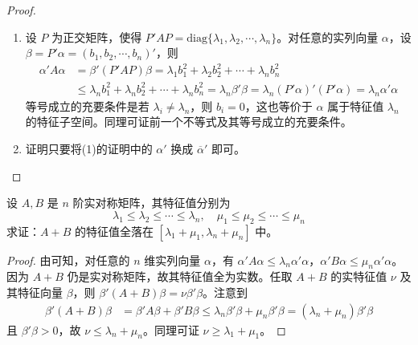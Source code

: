 \documentclass[../../main.tex]{subfiles}
\begin{document}
\begin{proof}
\begin{enumerate}[(1)]
\item 设 \(P\) 为正交矩阵，使得 \(P'AP = \mathrm{diag}\{\lambda_1,\lambda_2,\cdots,\lambda_n\}\)。对任意的实列向量 \(\alpha\)，设 \(\beta = P'\alpha = (b_1,b_2,\cdots,b_n)'\)，则
\begin{align*}
\alpha'A\alpha &= \beta'(P'AP)\beta = \lambda_1b_1^2 + \lambda_2b_2^2 + \cdots + \lambda_nb_n^2\\
&\leq \lambda_nb_1^2 + \lambda_nb_2^2 + \cdots + \lambda_nb_n^2 = \lambda_n\beta'\beta = \lambda_n(P'\alpha)'(P'\alpha) = \lambda_n\alpha'\alpha
\end{align*}
等号成立的充要条件是若 \(\lambda_i \neq \lambda_n\)，则 \(b_i = 0\)，这也等价于 \(\alpha\) 属于特征值 \(\lambda_n\) 的特征子空间。同理可证前一个不等式及其等号成立的充要条件。

\item 证明只要将(1)的证明中的 \(\alpha'\) 换成 \(\overline{\alpha}'\) 即可。
\end{enumerate}
\end{proof}

\begin{example}\label{example:例9.53}
设 \(A,B\) 是 \(n\) 阶实对称矩阵，其特征值分别为
\[
\lambda_1 \leq \lambda_2 \leq \cdots \leq \lambda_n,\quad \mu_1 \leq \mu_2 \leq \cdots \leq \mu_n
\]
求证：\(A + B\) 的特征值全落在 \([\lambda_1 + \mu_1,\lambda_n + \mu_n]\) 中。
\end{example}
\begin{proof}
由可知，对任意的 \(n\) 维实列向量 \(\alpha\)，有 \(\alpha'A\alpha \leq \lambda_n\alpha'\alpha\)，\(\alpha'B\alpha \leq \mu_n\alpha'\alpha\)。因为 \(A + B\) 仍是实对称矩阵，故其特征值全为实数。任取 \(A + B\) 的实特征值 \(\nu\) 及其特征向量 \(\beta\)，则 \(\beta'(A + B)\beta = \nu\beta'\beta\)。注意到
\begin{align*}
\beta'(A + B)\beta &= \beta'A\beta + \beta'B\beta \leq \lambda_n\beta'\beta + \mu_n\beta'\beta = (\lambda_n + \mu_n)\beta'\beta
\end{align*}
且 \(\beta'\beta > 0\)，故 \(\nu \leq \lambda_n + \mu_n\)。同理可证 \(\nu \geq \lambda_1 + \mu_1\)。 
\end{proof}
\end{document}
